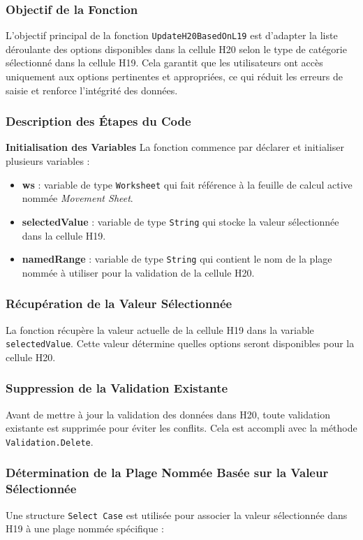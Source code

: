 \documentclass[a4paper, oneside, 12pt, final]{extreport}
\begin{document}
\subsubsection{Objectif de la Fonction}
L'objectif principal de la fonction \texttt{UpdateH20BasedOnL19} est d'adapter la liste déroulante des options disponibles dans la cellule H20 selon le type de catégorie sélectionné dans la cellule H19. Cela garantit que les utilisateurs ont accès uniquement aux options pertinentes et appropriées, ce qui réduit les erreurs de saisie et renforce l'intégrité des données.

\subsubsection{Description des Étapes du Code}
\textbf{Initialisation des Variables}
La fonction commence par déclarer et initialiser plusieurs variables :

\begin{itemize}
    \item \textbf{ws} : variable de type \texttt{Worksheet} qui fait référence à la feuille de calcul active nommée \textit{Movement Sheet}.
    \item \textbf{selectedValue} : variable de type \texttt{String} qui stocke la valeur sélectionnée dans la cellule H19.
    \item \textbf{namedRange} : variable de type \texttt{String} qui contient le nom de la plage nommée à utiliser pour la validation de la cellule H20.
\end{itemize}

\subsubsection{Récupération de la Valeur Sélectionnée}
La fonction récupère la valeur actuelle de la cellule H19 dans la variable \texttt{selectedValue}. Cette valeur détermine quelles options seront disponibles pour la cellule H20.

\subsubsection{Suppression de la Validation Existante}
Avant de mettre à jour la validation des données dans H20, toute validation existante est supprimée pour éviter les conflits. Cela est accompli avec la méthode \texttt{Validation.Delete}.

\subsubsection{Détermination de la Plage Nommée Basée sur la Valeur Sélectionnée}
Une structure \texttt{Select Case} est utilisée pour associer la valeur sélectionnée dans H19 à une plage nommée spécifique :
\end{document}

